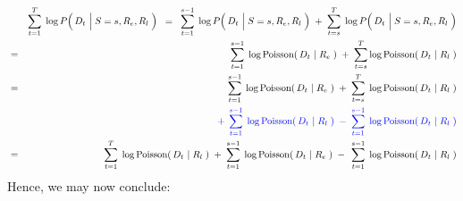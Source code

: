 \begin{eqnarray*}
&&
	\overset{T}{\underset{t=1}{\sum}}\;
	\log P\!\left(\,D_{t} \,\left\vert\; S\overset{{\color{white}1}}{=}s,R_{e},R_{l}\right.\,\right)
\;\; = \;\;
	\overset{s-1}{\underset{t=1}{\sum}}\;
	\log P\!\left(\,D_{t} \,\left\vert\; S\overset{{\color{white}1}}{=}s,R_{e},R_{l}\right.\,\right)
	\; + \;
	\overset{T}{\underset{t=s}{\sum}}\;
	\log P\!\left(\,D_{t} \,\left\vert\; S\overset{{\color{white}1}}{=}s,R_{e},R_{l}\right.\,\right)
\\
&=&
	\overset{s-1}{\underset{t=1}{\sum}}\;
	\log\textnormal{Poisson}\!\left(\,D_{t} \,\left\vert\; R_{e}\right.\,\right)
	\; + \;
	\overset{T}{\underset{t=s}{\sum}}
	\log\textnormal{Poisson}\!\left(\,D_{t} \,\left\vert\; R_{l}\right.\,\right)
\\
&=&
	{\color{white}+}\;\,
	\overset{s-1}{\underset{t=1}{\sum}}\;
	\log\textnormal{Poisson}\!\left(\,D_{t} \,\left\vert\; R_{e}\right.\,\right)
	\; + \;
	\overset{T}{\underset{t=s}{\sum}}\;
	\log\textnormal{Poisson}\!\left(\,D_{t} \,\left\vert\; R_{l}\right.\,\right)
\\
&&
	{\color{blue}
	+\;\,
	\overset{s-1}{\underset{t=1}{\sum}}\;
	\log\textnormal{Poisson}\!\left(\,D_{t} \,\left\vert\; R_{l}\right.\,\right)
	\; - \;
	\overset{s-1}{\underset{t=1}{\sum}}\;
	\log\textnormal{Poisson}\!\left(\,D_{t} \,\left\vert\; R_{l}\right.\,\right)
	}
\\
&=&
	\overset{T}{\underset{t=1}{\sum}}\;
	\log\textnormal{Poisson}\!\left(\,D_{t} \,\left\vert\; R_{l}\right.\,\right)
	\;+\;
	\overset{s-1}{\underset{t=1}{\sum}}\;
	\log\textnormal{Poisson}\!\left(\,D_{t} \,\left\vert\; R_{e}\right.\,\right)
		\;-\;\,
		\overset{s-1}{\underset{t=1}{\sum}}\;
		\log\textnormal{Poisson}\!\left(\,D_{t} \,\left\vert\; R_{l}\right.\,\right)
\end{eqnarray*}
Hence, we may now conclude:
